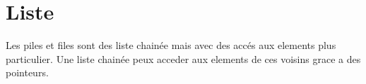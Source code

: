 \section{Liste}

Les piles et files sont des liste chainée mais avec des accés aux elements plus particulier. Une liste chainée peux acceder aux elements de ces voisins grace a des pointeurs.\\



